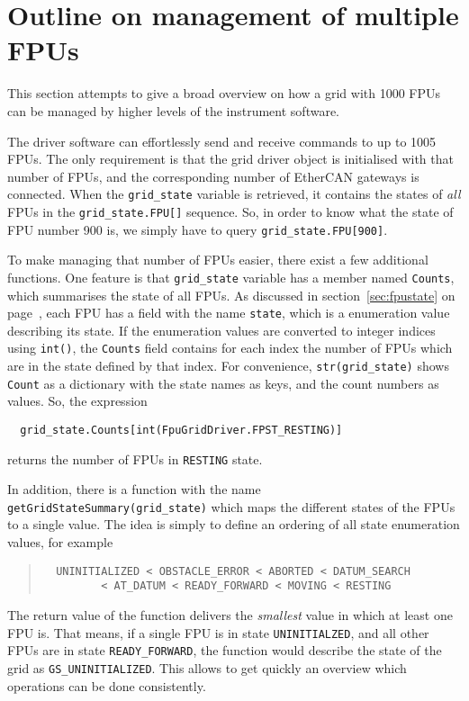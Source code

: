 \documentclass{scrartcl}[12pt,a4paper]
\begin{document}
\section{Outline on management of multiple FPUs}

This section attempts to give a broad overview on how a grid with 1000
FPUs can be managed by higher levels of the instrument software.

The driver software can effortlessly send and receive commands to up
to 1005 FPUs. The only requirement is that the grid driver object is
initialised with that number of FPUs, and the corresponding number of
EtherCAN gateways is connected. When the \texttt{grid\_state} variable
is retrieved, it contains the states of \emph{all} FPUs in the
\verb+grid_state.FPU[]+ sequence. So, in order to know what the state
of FPU number 900 is, we simply have to query
\verb+grid_state.FPU[900]+.

To make managing that number of FPUs easier, there exist a few
additional functions. One feature is that \texttt{grid\_state}
variable has a member named \texttt{Counts}, which summarises the
state of all FPUs. As discussed in section~\ref{sec:fpustate} on
page~\pageref{sec:fpustate}, each FPU has a field with the name
\texttt{state}, which is a enumeration value describing its state. If
the enumeration values are converted to integer indices using
\texttt{int()}, the \texttt{Counts} field contains for each index the
number of FPUs which are in the state defined by that index. For
convenience, \texttt{str(grid\_state)} shows \texttt{Count} as a
dictionary with the state names as keys, and the count numbers as
values. So, the expression
\begin{verbatim}
  grid_state.Counts[int(FpuGridDriver.FPST_RESTING)]
\end{verbatim}
returns the number of FPUs in \texttt{RESTING} state.

In addition, there is a function with the name
\texttt{getGridStateSummary(grid\_state)} which maps the different states of the
FPUs to a single value. The idea is simply to define an ordering of
all state enumeration values, for example
\begin{quote}
\begin{verbatim}
  UNINITIALIZED < OBSTACLE_ERROR < ABORTED < DATUM_SEARCH
         < AT_DATUM < READY_FORWARD < MOVING < RESTING
\end{verbatim}
\end{quote}

The return value of the function delivers the \emph{smallest} value in
which at least one FPU is.  That means, if a single FPU is in state
\texttt{UNINITIALZED}, and all other FPUs are in state
\texttt{READY\_FORWARD}, the function would describe the state of the
grid as \texttt{GS\_UNINITIALIZED}. This allows to get quickly an overview
which operations can be done consistently.
\end{document}
